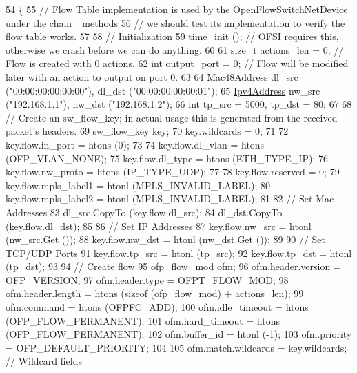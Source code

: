 \begin{DoxyCode}
54 \{
55   \textcolor{comment}{// Flow Table implementation is used by the OpenFlowSwitchNetDevice under the chain\_ methods}
56   \textcolor{comment}{// we should test its implementation to verify the flow table works.}
57 
58   \textcolor{comment}{// Initialization}
59   time\_init (); \textcolor{comment}{// OFSI requires this, otherwise we crash before we can do anything.}
60 
61   \textcolor{keywordtype}{size\_t} actions\_len = 0; \textcolor{comment}{// Flow is created with 0 actions.}
62   \textcolor{keywordtype}{int} output\_port = 0; \textcolor{comment}{// Flow will be modified later with an action to output on port 0.}
63 
64   \hyperlink{classns3_1_1Mac48Address}{Mac48Address} dl\_src (\textcolor{stringliteral}{"00:00:00:00:00:00"}), dl\_dst (\textcolor{stringliteral}{"00:00:00:00:00:01"});
65   \hyperlink{classns3_1_1Ipv4Address}{Ipv4Address} nw\_src (\textcolor{stringliteral}{"192.168.1.1"}), nw\_dst (\textcolor{stringliteral}{"192.168.1.2"});
66   \textcolor{keywordtype}{int} tp\_src = 5000, tp\_dst = 80;
67 
68   \textcolor{comment}{// Create an sw\_flow\_key; in actual usage this is generated from the received packet's headers.}
69   sw\_flow\_key key;
70   key.wildcards = 0;
71 
72   key.flow.in\_port = htons (0);
73 
74   key.flow.dl\_vlan = htons (OFP\_VLAN\_NONE);
75   key.flow.dl\_type = htons (ETH\_TYPE\_IP);
76   key.flow.nw\_proto = htons (IP\_TYPE\_UDP);
77 
78   key.flow.reserved = 0;
79   key.flow.mpls\_label1 = htonl (MPLS\_INVALID\_LABEL);
80   key.flow.mpls\_label2 = htonl (MPLS\_INVALID\_LABEL);
81 
82   \textcolor{comment}{// Set Mac Addresses}
83   dl\_src.CopyTo (key.flow.dl\_src);
84   dl\_dst.CopyTo (key.flow.dl\_dst);
85 
86   \textcolor{comment}{// Set IP Addresses}
87   key.flow.nw\_src = htonl (nw\_src.Get ());
88   key.flow.nw\_dst = htonl (nw\_dst.Get ());
89 
90   \textcolor{comment}{// Set TCP/UDP Ports}
91   key.flow.tp\_src = htonl (tp\_src);
92   key.flow.tp\_dst = htonl (tp\_dst);
93 
94   \textcolor{comment}{// Create flow}
95   ofp\_flow\_mod ofm;
96   ofm.header.version = OFP\_VERSION;
97   ofm.header.type = OFPT\_FLOW\_MOD;
98   ofm.header.length = htons (\textcolor{keyword}{sizeof} (ofp\_flow\_mod) + actions\_len);
99   ofm.command = htons (OFPFC\_ADD);
100   ofm.idle\_timeout = htons (OFP\_FLOW\_PERMANENT);
101   ofm.hard\_timeout = htons (OFP\_FLOW\_PERMANENT);
102   ofm.buffer\_id = htonl (-1);
103   ofm.priority = OFP\_DEFAULT\_PRIORITY;
104 
105   ofm.match.wildcards = key.wildcards;                                 \textcolor{comment}{// Wildcard fields}

\end{DoxyCode}
